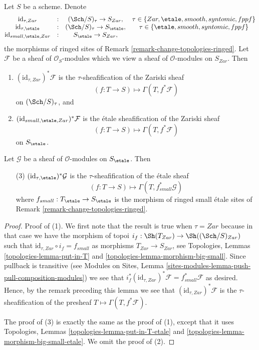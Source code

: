 \begin{lemma}
\label{lemma-compare-sites}
Let $S$ be a scheme. Denote
$$
\begin{matrix}
\text{id}_{\tau, Zar} & : & (\Sch/S)_\tau \to S_{Zar}, &
\tau \in \{Zar, \etale, smooth, syntomic, fppf\} \\
\text{id}_{\tau, \etale} & : &
(\Sch/S)_\tau \to S_\etale, &
\tau \in \{\etale, smooth, syntomic, fppf\} \\
\text{id}_{small, \etale, Zar} & : & S_\etale \to S_{Zar},
\end{matrix}
$$
the morphisms of ringed sites of
Remark \ref{remark-change-topologies-ringed}.
Let $\mathcal{F}$ be a sheaf of $\mathcal{O}_S$-modules
which we view a sheaf of $\mathcal{O}$-modules on $S_{Zar}$. Then
\begin{enumerate}
\item $(\text{id}_{\tau, Zar})^*\mathcal{F}$ is the $\tau$-sheafification
of the Zariski sheaf
$$
(f : T \to S) \longmapsto \Gamma(T, f^*\mathcal{F})
$$
on $(\Sch/S)_\tau$, and
\item $(\text{id}_{small, \etale, Zar})^*\mathcal{F}$ is the
\'etale sheafification of the Zariski sheaf
$$
(f : T \to S) \longmapsto \Gamma(T, f^*\mathcal{F})
$$
on $S_\etale$.
\end{enumerate}
Let $\mathcal{G}$ be a sheaf of $\mathcal{O}$-modules
on $S_\etale$. Then
\begin{enumerate}
\item[(3)] $(\text{id}_{\tau, \etale})^*\mathcal{G}$ is the
$\tau$-sheafification of the \'etale sheaf
$$
(f : T \to S) \longmapsto \Gamma(T, f_{small}^*\mathcal{G})
$$
where $f_{small} : T_\etale \to S_\etale$
is the morphism of ringed small \'etale sites of
Remark \ref{remark-change-topologies-ringed}.
\end{enumerate}
\end{lemma}

\begin{proof}
Proof of (1). We first note that the result is true when $\tau = Zar$
because in that case we have the morphism of topoi
$i_f : \Sh(T_{Zar}) \to \Sh((\Sch/S)_{Zar})$
such that $\text{id}_{\tau, Zar} \circ i_f = f_{small}$ as morphisms
$T_{Zar} \to S_{Zar}$, see
Topologies, Lemmas \ref{topologies-lemma-put-in-T} and
\ref{topologies-lemma-morphism-big-small}.
Since pullback is transitive (see
Modules on Sites,
Lemma \ref{sites-modules-lemma-push-pull-composition-modules})
we see that
$i_f^*(\text{id}_{\tau, Zar})^*\mathcal{F} = f_{small}^*\mathcal{F}$
as desired. Hence, by the remark preceding this lemma we see that
$(\text{id}_{\tau, Zar})^*\mathcal{F}$ is the $\tau$-sheafification of
the presheaf $T \mapsto \Gamma(T, f^*\mathcal{F})$.

\medskip\noindent
The proof of (3) is exactly the same as the proof of (1), except that it
uses
Topologies, Lemmas \ref{topologies-lemma-put-in-T-etale} and
\ref{topologies-lemma-morphism-big-small-etale}.
We omit the proof of (2).
\end{proof}

